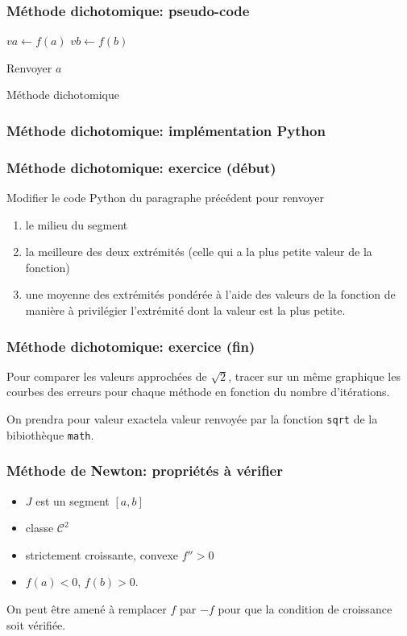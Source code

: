 \begin{frame}
  \frametitle{Méthode dichotomique: pseudo-code}
\begin{algorithm}[H]
  
  $va\leftarrow f(a)$   $vb\leftarrow f(b)$\;
  
  Renvoyer $a$\;
  \caption{Méthode dichotomique}
  \label{resolnumequ_1}
\end{algorithm}
\end{frame}

\begin{frame}
  \frametitle{Méthode dichotomique: implémentation Python}

\end{frame}

\begin{frame}
  \frametitle{Méthode dichotomique: exercice (début)}
Modifier le code Python du paragraphe précédent pour renvoyer
\begin{enumerate}
  \item le milieu du segment
  \item la meilleure des deux extrémités (celle qui a la plus petite valeur de la fonction)
  \item une moyenne des extrémités pondérée à l'aide des valeurs de la fonction de manière à privilégier l'extrémité dont la valeur est la plus petite.
\end{enumerate}
\end{frame}

\begin{frame}[fragile]
  \frametitle{Méthode dichotomique: exercice (fin)}

Pour comparer les valeurs approchées de $\sqrt{2}$, tracer sur un même graphique les courbes des erreurs pour chaque méthode en fonction du nombre d'itérations.

On prendra pour valeur \og exacte\fg la valeur renvoyée par la fonction \texttt{sqrt} de la bibiothèque \texttt{math}.
\end{frame}

\begin{frame}
  \frametitle{Méthode de Newton: propriétés à vérifier}
\begin{itemize}
  \item $J$ est un segment $[a,b]$
  \item classe $\mathcal{C}^2$
  \item strictement croissante, convexe $f''>0$
  \item $f(a)<0$, $f(b)>0$. 
\end{itemize}
On peut être amené à remplacer $f$ par $-f$ pour que la condition de croissance soit vérifiée. 
\end{frame}

